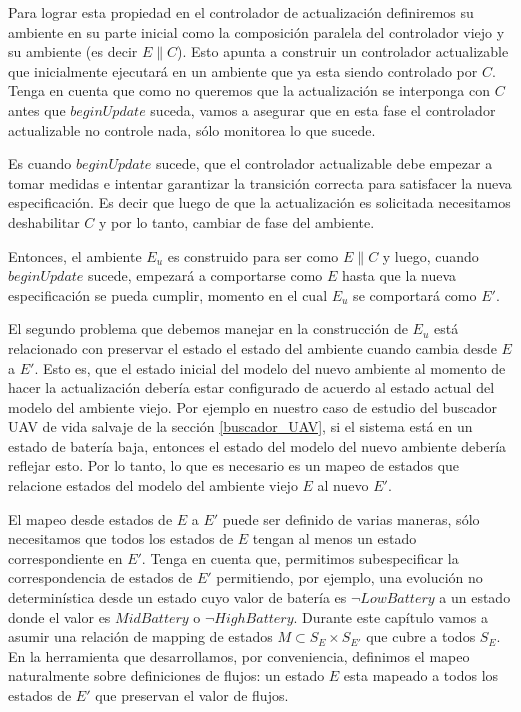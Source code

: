 Para lograr esta propiedad en el controlador de actualización definiremos su ambiente en su parte inicial como la
composición paralela del controlador viejo y su ambiente (es decir $E\|C$). Esto apunta a construir un controlador
actualizable que inicialmente ejecutará en un ambiente que ya esta siendo controlado por $C$. Tenga en cuenta que como
no queremos que la actualización se interponga con $C$ antes que $beginUpdate$ suceda, vamos a asegurar que en esta fase
el controlador actualizable no controle nada, sólo monitorea lo que sucede.

Es cuando $beginUpdate$ sucede, que el controlador actualizable debe empezar a tomar medidas e intentar garantizar
la transición correcta para satisfacer la nueva especificación. Es decir que luego de que la actualización es
solicitada necesitamos deshabilitar $C$ y por lo tanto, cambiar de fase del ambiente.

Entonces, el ambiente $E_u$ es construido para ser como $E\|C$ y luego, cuando $beginUpdate$ sucede, empezará a
comportarse como $E$ hasta que la nueva especificación se pueda cumplir, momento en el cual $E_u$ se comportará como
$E'$.

El segundo problema que debemos manejar en la construcción de $E_u$ está relacionado con preservar el estado el estado
del ambiente cuando cambia desde $E$ a $E'$. Esto es, que el estado inicial del modelo del nuevo ambiente al
momento de hacer la actualización debería estar configurado de acuerdo al estado actual del modelo del ambiente viejo.
Por ejemplo en nuestro caso de estudio del buscador UAV de vida salvaje de la sección \ref{buscador_UAV}, si el sistema
está en un estado de batería baja, entonces el estado del modelo del nuevo ambiente debería reflejar esto. Por lo tanto,
lo que es necesario es un mapeo de estados que relacione estados del modelo del ambiente viejo $E$ al nuevo $E'$.

El mapeo desde estados de $E$ a $E'$ puede ser definido de varias maneras, sólo necesitamos que todos los estados de $E$
tengan al menos un estado correspondiente en $E'$. Tenga en cuenta que, permitimos subespecificar la correspondencia de
estados de $E'$ permitiendo, por ejemplo, una evolución no determinística desde un estado cuyo valor de batería es
$\lnot LowBattery$ a un estado donde el valor es $MidBattery$ o $\neg HighBattery$. Durante este capítulo vamos a asumir
una relación de mapping de estados $M \subset S_E \times S_{E'}$ que cubre a todos $S_E$. En la herramienta que
desarrollamos, por conveniencia, definimos el mapeo naturalmente sobre definiciones de flujos: un estado $E$ esta
mapeado a todos los estados de $E'$ que preservan el valor de flujos.

